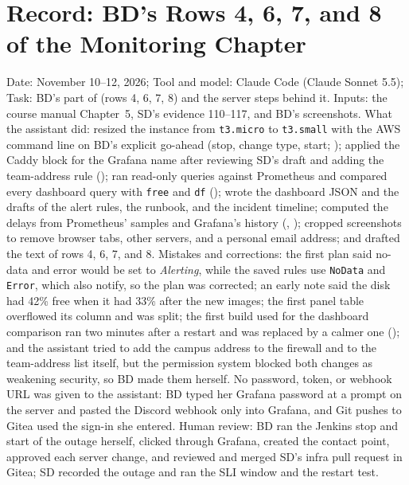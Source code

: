 \section{Record: BD's Rows 4, 6, 7, and 8 of the Monitoring Chapter}
Date: November 10--12, 2026; Tool and model: Claude Code (Claude Sonnet 5.5);
Task: BD's part of  (rows 4, 6, 7, 8) and the server steps behind it. Inputs: the course manual \cite{DosManual} Chapter~5, SD's evidence 110--117,
and BD's screenshots. What the assistant did: resized the instance from \texttt{t3.micro} to \texttt{t3.small} with the AWS command line on BD's explicit go-ahead
(stop, change type, start; ); applied the Caddy block for the Grafana name after reviewing SD's draft and adding the team-address rule ();
ran read-only queries against Prometheus and compared every dashboard query with \texttt{free} and \texttt{df} (); wrote the dashboard JSON and the drafts of the
alert rules, the runbook, and the incident timeline; computed the delays from Prometheus' samples and Grafana's history (, ); cropped screenshots to remove browser tabs,
other servers, and a personal email address; and drafted the text of rows 4, 6, 7, and 8.
Mistakes and corrections: the first plan said no-data and error would be set to \emph{Alerting}, while the saved rules use \texttt{NoData} and \texttt{Error}, which also notify, so the plan was corrected; an early note said the disk had
42\% free when it had 33\% after the new images; the first panel table overflowed its column and was split; the first build used for the dashboard comparison ran two minutes after a restart and was replaced by a calmer one
(); and the assistant tried to add the campus address to the firewall and to the team-address list itself, but the permission system blocked both changes as weakening security, so BD made them herself.
No password, token, or webhook URL was given to the assistant: BD typed her Grafana password at a prompt on the server and pasted the Discord webhook only into Grafana, and Git pushes to Gitea used the sign-in she entered.
Human review: BD ran the Jenkins stop and start of the outage herself, clicked through Grafana, created the contact point, approved each server change, and reviewed and merged SD's infra pull request in Gitea; SD recorded the outage and ran the SLI window and the restart test.
